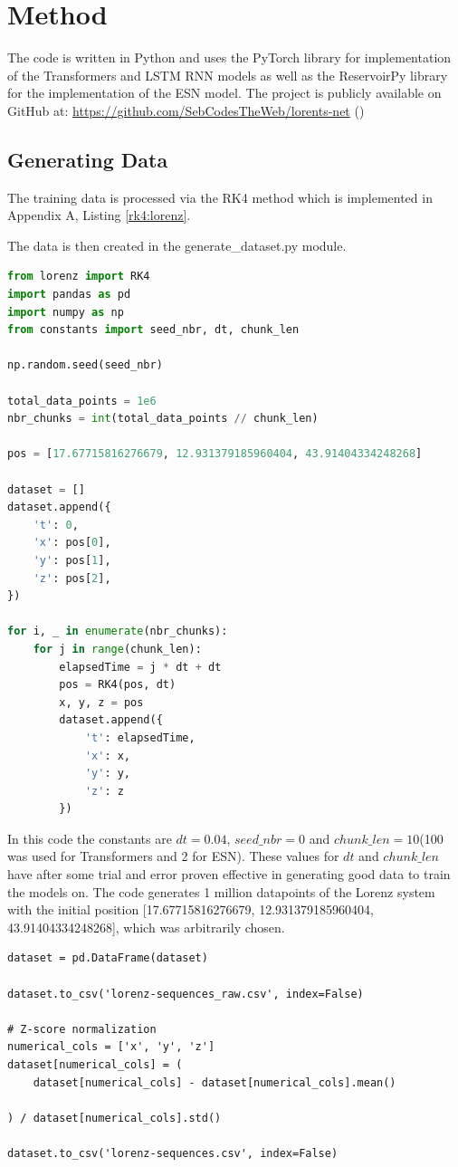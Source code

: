 \documentclass[11pt]{article}
\begin{document}
\section{Method}
The code is written in Python and uses the PyTorch library for implementation of the Transformers and LSTM RNN models as well as the ReservoirPy library for the implementation of the ESN model. The project is publicly available on GitHub at: \url{https://github.com/SebCodesTheWeb/lorents-net} (\cite{github})


\subsection{Generating Data}

The training data is processed via the RK4 method which is implemented in Appendix A, Listing \ref{rk4:lorenz}.

The data is then created in the {generate\_dataset.py} module.

\begin{lstlisting}[language=Python]
from lorenz import RK4
import pandas as pd
import numpy as np
from constants import seed_nbr, dt, chunk_len

np.random.seed(seed_nbr)

total_data_points = 1e6
nbr_chunks = int(total_data_points // chunk_len)

pos = [17.67715816276679, 12.931379185960404, 43.91404334248268]

dataset = []
dataset.append({
    't': 0,
    'x': pos[0],
    'y': pos[1],
    'z': pos[2],
})

for i, _ in enumerate(nbr_chunks):
    for j in range(chunk_len):
        elapsedTime = j * dt + dt
        pos = RK4(pos, dt)
        x, y, z = pos
        dataset.append({
            't': elapsedTime,
            'x': x,
            'y': y,
            'z': z
        })
\end{lstlisting}

In this code the constants are $dt = 0.04$, $seed\_nbr = 0$ and $chunk\_len = 10$(100 was used for Transformers and 2 for ESN). These values for $dt$ and $chunk\_len$ have after some trial and error proven effective in generating good data to train the models on. The code generates 1 million datapoints of the Lorenz system with the initial position [17.67715816276679, 12.931379185960404, 43.91404334248268], which was arbitrarily chosen. 

\begin{lstlisting}
dataset = pd.DataFrame(dataset)

dataset.to_csv('lorenz-sequences_raw.csv', index=False)

# Z-score normalization
numerical_cols = ['x', 'y', 'z']
dataset[numerical_cols] = (
    dataset[numerical_cols] - dataset[numerical_cols].mean()

) / dataset[numerical_cols].std()

dataset.to_csv('lorenz-sequences.csv', index=False)
\end{lstlisting}
\end{document}
